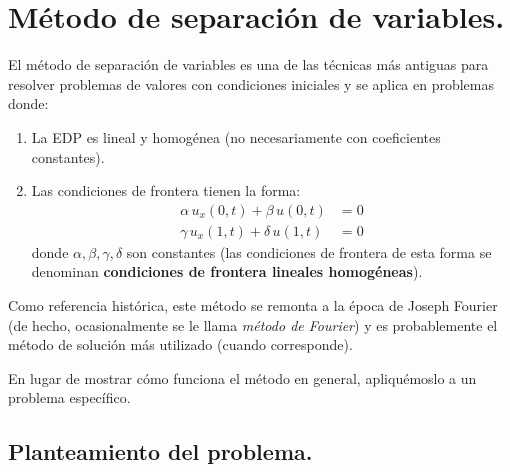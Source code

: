 \section{Método de separación de variables.}

El método de separación de variables es una de las técnicas más antiguas para resolver problemas de valores con condiciones iniciales y se aplica en problemas donde:
\begin{enumerate}
\item La EDP es lineal y homogénea (no necesariamente con coeficientes constantes).
\item Las condiciones de frontera tienen la forma:
\begin{align*}
\alpha \, u_{x} (0, t) + \beta \, u(0, t) &= 0 \\
\gamma \, u_{x} (1, t) + \delta \, u(1, t) &= 0
\end{align*}
donde $\alpha, \beta, \gamma, \delta$ son constantes (las condiciones de frontera de esta forma se denominan \textbf{condiciones de frontera lineales homogéneas}).
\end{enumerate}
Como referencia histórica, este método se remonta a la época de Joseph Fourier (de hecho, ocasionalmente se le llama \emph{método de Fourier}) y es probablemente el método de solución más utilizado (cuando corresponde).
\par
En lugar de mostrar cómo funciona el método en general, apliquémoslo a un problema específico.

\subsection{Planteamiento del problema.}

